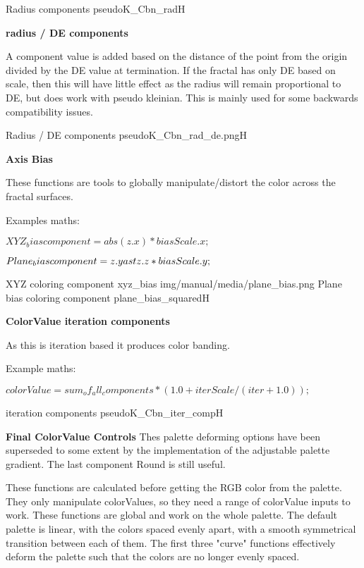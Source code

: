 {Radius components}
{pseudoK_Cbn_rad}{H}

\textbf{radius / DE components}

A component value is added based on the distance of the point from the origin divided by the DE value at termination. If the fractal has only DE based on scale, then this will have little effect as the radius will remain proportional to DE, but does work with pseudo kleinian. This is mainly used for some backwards compatibility issues.

{Radius / DE components}
{pseudoK_Cbn_rad_de.png}{H}

\textbf{Axis Bias}

These functions are tools to globally manipulate/distort the color across the fractal surfaces.
 
Examples maths:

$XYZ_bias                component = abs(z.x) \ast biasScale.x;$

$Plane_bias              component = z.y \\ast z.z \ast biasScale.y;$

{XYZ coloring component}
{xyz_bias}
{img/manual/media/plane_bias.png}
{Plane bias coloring component}
{plane_bias_squared}{H}

\textbf{ColorValue iteration components}

As this is iteration based it produces color banding.

Example maths:

$colorValue =  sum_of_all_components *  ( 1.0 + iterScale / ( iter + 1.0));$

{iteration components}
{pseudoK_Cbn_iter_comp}{H}

\textbf{Final ColorValue Controls}
Thes palette deforming options have been superseded to some extent by the implementation of the adjustable palette gradient. The last component Round is still useful.

These functions are calculated before getting the RGB color from the palette. They only manipulate colorValues, so they need a range of colorValue inputs to work. These functions are global and work on the whole palette. The default palette is linear, with the colors spaced evenly apart, with a smooth symmetrical transition between each of them. The first three "curve" functions effectively deform the palette such that the colors are no longer evenly spaced.

